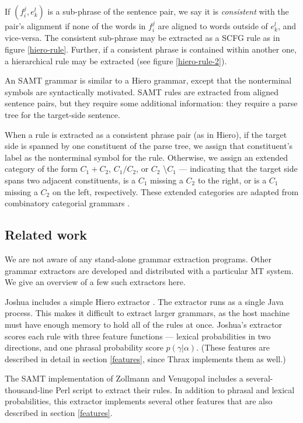 \documentclass[11pt]{article}
\begin{document}
If $(f_i^j,e_k^l)$ is a sub-phrase of the sentence pair, we say it is {\em consistent} with the pair's alignment if none of the words in $f_i^j$ are aligned to words outside of $e_k^l$, and vice-versa. The consistent sub-phrase may be extracted as a SCFG rule as in figure \ref{hiero-rule}. Further, if a consistent phrase is contained within another one, a hierarchical rule may be extracted (see figure \ref{hiero-rule-2}).

An SAMT grammar \cite{samt2006} is similar to a Hiero grammar, except that the nonterminal symbols are syntactically motivated. SAMT rules are extracted from aligned sentence pairs, but they require some additional information: they require a parse tree for the target-side sentence.

When a rule is extracted as a consistent phrase pair (as in Hiero), if the target side is spanned by one constituent of the parse tree, we assign that constituent's label as the nonterminal symbol for the rule. Otherwise, we assign an extended category of the form $C_1+C_2$, $C_1 / C_2$, or $C_2$ \textbackslash $C_1$ --- indicating that the target side spans two adjacent constituents, is a $C_1$ missing a $C_2$ to the right, or is a $C_1$ missing a $C_2$ on the left, respectively. These extended categories are adapted from combinatory categorial grammars \cite{Steedman1999}.

\subsection{Related work}

We are not aware of any stand-alone grammar extraction programs. Other grammar extractors are developed and distributed with a particular MT system. We give an overview of a few such extractors here.

Joshua includes a simple Hiero extractor \cite{schwartz2010}. The extractor runs as a single Java process. This makes it difficult to extract larger grammars, as the host machine must have enough memory to hold all of the rules at once. Joshua's extractor scores each rule with three feature functions --- lexical probabilities in two directions, and one phrasal probability score $p(\gamma|\alpha)$. (These features are described in detail in section \ref{features}, since Thrax implements them as well.) 

The SAMT implementation of Zollmann and Venugopal  includes a several-thousand-line Perl script to extract their rules. In addition to phrasal and lexical probabilities, this extractor implements several other features that are also described in section \ref{features}.
\end{document}
